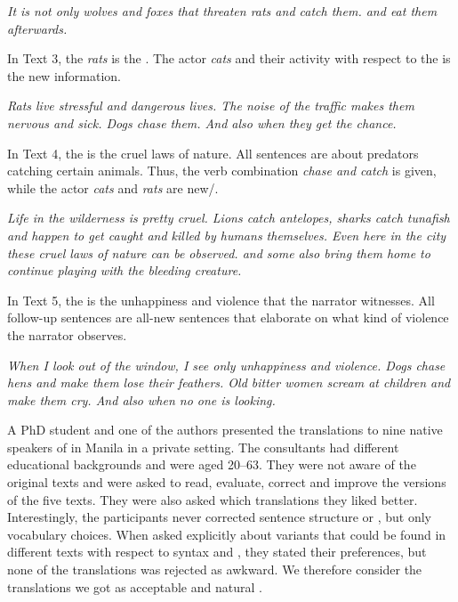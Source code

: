 \documentclass[output=paper,
,modfonts
,nonflat]{langsci/langscibook}
\begin{document}
\begin{exe}
\textit{It is not only wolves and foxes that threaten rats and catch them.  and eat them afterwards.}
\end{exe}

\noindent In Text 3, the  \textit{rats} is the . The actor \textit{cats} and their activity with respect to the  is the new information.

\begin{exe}
 \textit{Rats live stressful and dangerous lives. The noise of the traffic makes them nervous and sick. Dogs chase them.  And also  when they get the chance.}
\end{exe}

\noindent In Text 4, the  is the cruel laws of nature.  All sentences are about predators catching certain animals. Thus, the verb combination \textit{chase and catch} is given, while the actor \textit{cats} and  \textit{rats} are new/.

\begin{exe}
 \textit{Life in the wilderness is pretty cruel. Lions catch antelopes, sharks catch tunafish and happen to get caught and killed by humans themselves. Even here in the city  these cruel laws of nature can be observed.  and  some also bring them home to continue playing with the bleeding creature.} 
\end{exe}

\noindent In Text 5, the   is the unhappiness and violence that the narrator witnesses. All follow-up sentences are all-new sentences that elaborate on what kind of violence the narrator observes.

\begin{exe}
 \textit{When I look out of the window, I see only unhappiness and violence.  Dogs chase hens and make them lose their feathers. Old bitter women scream at children and make them cry.  And also  when no one is looking.} 
\end{exe}

\noindent A PhD student and one of the authors presented the  translations to nine native speakers of  in Manila in a private setting. The consultants had different educational backgrounds and were aged 20--63. They were not aware of the original  texts and were asked to read, evaluate, correct and improve the  versions of the five texts. They were also asked which translations they liked better. Interestingly, the participants never corrected sentence structure or , but only vocabulary choices. When asked explicitly about variants that could be found in different texts with respect to syntax and , they stated their preferences, but none of the translations was rejected as awkward. We therefore consider the translations we got as acceptable and natural .
\end{document}
